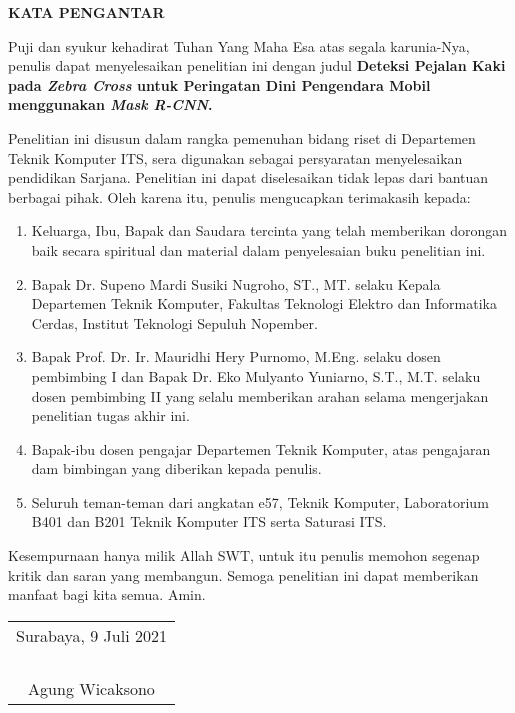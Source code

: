 \begin{center}
  \Large
  \textbf{KATA PENGANTAR}
\end{center}


Puji dan syukur kehadirat Tuhan Yang Maha Esa atas segala karunia-Nya, penulis  dapat menyelesaikan penelitian ini dengan judul \textbf{Deteksi Pejalan Kaki pada \textit{Zebra Cross} untuk Peringatan Dini Pengendara Mobil menggunakan \textit{Mask R-CNN}.}

Penelitian ini disusun dalam rangka pemenuhan bidang riset di Departemen Teknik Komputer ITS, sera digunakan sebagai persyaratan menyelesaikan pendidikan Sarjana. Penelitian ini dapat diselesaikan tidak lepas dari bantuan berbagai pihak. Oleh karena itu, penulis mengucapkan terimakasih kepada:

\begin{enumerate}[nolistsep]
  \item Keluarga, Ibu, Bapak dan Saudara tercinta yang telah memberikan dorongan baik secara spiritual dan material dalam penyelesaian buku penelitian ini.
  \item Bapak Dr. Supeno Mardi Susiki Nugroho, ST., MT. selaku Kepala Departemen Teknik Komputer, Fakultas Teknologi Elektro dan Informatika Cerdas, Institut Teknologi Sepuluh Nopember. 
  \item Bapak Prof. Dr. Ir. Mauridhi Hery Purnomo, M.Eng. selaku dosen pembimbing I dan Bapak Dr. Eko Mulyanto Yuniarno, S.T., M.T. selaku dosen pembimbing II yang selalu memberikan arahan selama mengerjakan penelitian tugas akhir ini.
  \item Bapak-ibu dosen pengajar Departemen Teknik Komputer, atas pengajaran dam bimbingan yang diberikan kepada penulis.
  \item Seluruh teman-teman dari angkatan e57, Teknik Komputer, Laboratorium B401 dan B201 Teknik Komputer ITS serta Saturasi ITS.
\end{enumerate}

Kesempurnaan hanya milik Allah SWT, untuk itu penulis memohon segenap kritik dan saran yang membangun. Semoga penelitian ini dapat memberikan manfaat bagi kita semua. Amin.


\begin{flushright}
  \begin{tabular}[b]{c}
    Surabaya, 9 Juli 2021\\
    \\
    \\
    \\
    \\
    Agung Wicaksono
  \end{tabular}
\end{flushright}

